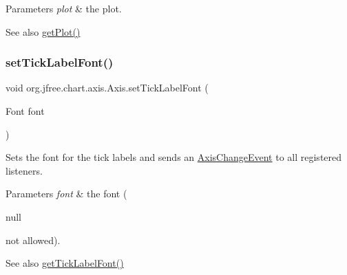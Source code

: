 \begin{DoxyParams}{Parameters}
{\em plot} & the plot.\\
\hline
\end{DoxyParams}
\begin{DoxySeeAlso}{See also}
\mbox{\hyperlink{classorg_1_1jfree_1_1chart_1_1axis_1_1_axis_a974e4dab4db47f7d25c7ef8ef8b20c6e}{get\+Plot()}} 
\end{DoxySeeAlso}
\mbox{\label{classorg_1_1jfree_1_1chart_1_1axis_1_1_axis_a2a73b99f22d1d3d2a2b9f6e0feb4fcad}} 
\subsubsection{\texorpdfstring{set\+Tick\+Label\+Font()}{setTickLabelFont()}}
{\footnotesize\ttfamily void org.\+jfree.\+chart.\+axis.\+Axis.\+set\+Tick\+Label\+Font (\begin{DoxyParamCaption}\item[{Font}]{font }\end{DoxyParamCaption})}

Sets the font for the tick labels and sends an \mbox{\hyperlink{}{Axis\+Change\+Event}} to all registered listeners.


\begin{DoxyParams}{Parameters}
{\em font} & the font (
\begin{DoxyCode}
null 
\end{DoxyCode}
 not allowed).\\
\hline
\end{DoxyParams}
\begin{DoxySeeAlso}{See also}
\mbox{\hyperlink{classorg_1_1jfree_1_1chart_1_1axis_1_1_axis_afa78f4c22da7b2d268e127767789ed4d}{get\+Tick\+Label\+Font()}} 
\end{DoxySeeAlso}
\mbox{\label{classorg_1_1jfree_1_1chart_1_1axis_1_1_axis_a087c1ec4d196a396c15fcaec85dfeb5b}} 
